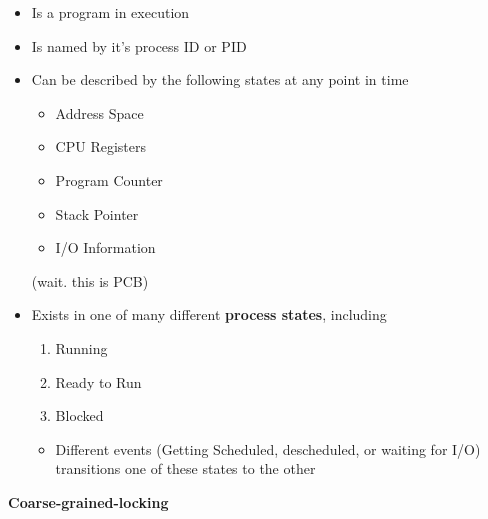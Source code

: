 \documentclass[12pt]{article}
\begin{document}
\begin{itemize}
    \item Is a program in execution
    \item Is named by it's process ID or PID
    \item Can be described by the following states at any point in time

    \begin{itemize}
        \item Address Space
        \item CPU Registers
        \item Program Counter
        \item Stack Pointer
        \item I/O Information
    \end{itemize}

    (wait. this is PCB)

    \item Exists in one of many different \textbf{process states}, including

    \begin{enumerate}[1.]
        \item Running
        \item Ready to Run
        \item Blocked
    \end{enumerate}

    \bigskip

    \begin{itemize}
        \item Different events (Getting Scheduled, descheduled, or waiting for I/O)
        transitions one of these states to the other
    \end{itemize}

\end{itemize}

\item \textbf{Coarse-grained-locking}
\end{document}
